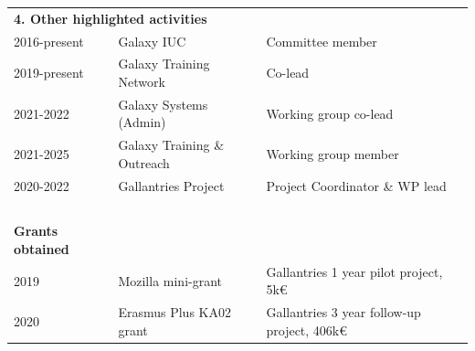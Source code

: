 \begin{table}[h!t]
    \begin{tabular}{lll}

        \multicolumn{3}{l}{\textbf{4.  Other highlighted activities}} \\
        2016-present & Galaxy IUC & Committee member \\
        2019-present & Galaxy Training Network & Co-lead  \\
        2021-2022 & Galaxy Systems (Admin) & Working group co-lead \\
        2021-2025 & Galaxy Training \& Outreach & Working group member \\
        2020-2022 & Gallantries Project & Project Coordinator \& WP lead \\
        \ \\
        \textbf{Grants obtained} \\
         2019 & Mozilla mini-grant & Gallantries 1 year pilot project, 5k€  \\
         2020 & Erasmus Plus KA02 grant & Gallantries 3 year follow-up project, 406k€ \\
    \end{tabular}
\end{table}



\normalsize
